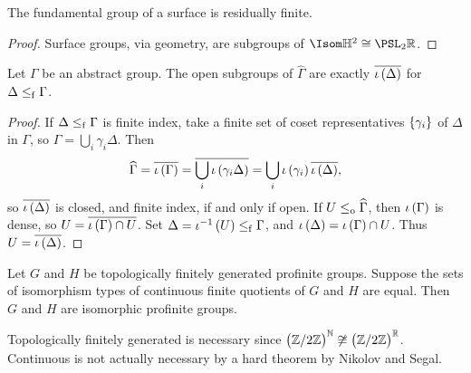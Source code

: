 \begin{proposition}
The fundamental group of a surface is residually finite.
\end{proposition}

\begin{proof}
Surface groups, via geometry, are subgroups of $ \Isom \HH^2 \cong \PSL_2 \RR $.
\end{proof}

\pagebreak

\begin{lemma}
Let $ \Gamma $ be an abstract group. The open subgroups of $ \widehat{\Gamma} $ are exactly $ \overline{\iota\br{\Delta}} $ for $ \Delta \le_{\mathrm{f}} \Gamma $.
\end{lemma}

\begin{proof}
If $ \Delta \le_{\mathrm{f}} \Gamma $ is finite index, take a finite set of coset representatives $ \cbr{\gamma_i} $ of $ \Delta $ in $ \Gamma $, so $ \Gamma = \bigcup_i \gamma_i\Delta $. Then
$$ \widehat{\Gamma} = \overline{\iota\br{\Gamma}} = \overline{\bigcup_i \iota\br{\gamma_i\Delta}} = \bigcup_i \iota\br{\gamma_i}\overline{\iota\br{\Delta}}, $$
so $ \overline{\iota\br{\Delta}} $ is closed, and finite index, if and only if open. If $ U \le_{\mathrm{o}} \widehat{\Gamma} $, then $ \iota\br{\Gamma} $ is dense, so $ U = \overline{\iota\br{\Gamma} \cap U} $. Set $ \Delta = \iota^{-1}\br{U} \le_\f \Gamma $, and $ \iota\br{\Delta} = \iota\br{\Gamma} \cap U $. Thus $ U = \overline{\iota\br{\Delta}} $.
\end{proof}

\begin{theorem}
Let $ G $ and $ H $ be topologically finitely generated profinite groups. Suppose the sets of isomorphism types of continuous finite quotients of $ G $ and $ H $ are equal. Then $ G $ and $ H $ are isomorphic profinite groups.
\end{theorem}

Topologically finitely generated is necessary since $ \br{\ZZ / 2\ZZ}^\NN \not\cong \br{\ZZ / 2\ZZ}^\RR $. Continuous is not actually necessary by a hard theorem by Nikolov and Segal.

